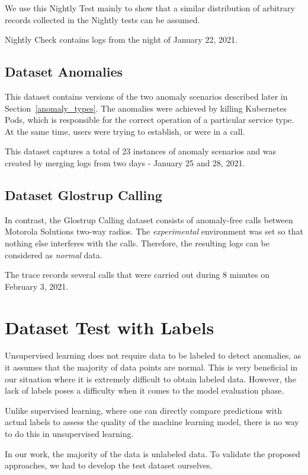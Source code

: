 We use this Nightly Test mainly to show that a similar distribution of arbitrary records collected in the Nightly tests can be assumed.

Nightly Check contains logs from the night of January 22, 2021.

\subsection{Dataset Anomalies}

This dataset contains versions of the two anomaly scenarios described later in Section~\ref{anomaly_types}. 
The anomalies were achieved by killing Kubernetes Pods, which is responsible for the correct operation of a particular service type. 
At the same time, users were trying to establish, or were in a call.

This dataset captures a total of 23 instances of anomaly scenarios and was created by merging logs from two days - January 25 and 28, 2021.

\subsection{Dataset Glostrup Calling}

In contrast, the Glostrup Calling dataset consists of anomaly-free calls between Motorola Solutions two-way radios. 
The \textit{experimental} environment was set so that nothing else interferes with the calls. Therefore, the resulting logs can be considered as \textit{normal} data.

The trace records several calls that were carried out during 8 minutes on February 3, 2021.

\section{Dataset Test with Labels} 
\label{section:testset}
Unsupervised learning does not require data to be labeled to detect anomalies, as it assumes that the majority of data points are normal.  This is very beneficial in our situation where it is extremely difficult to obtain labeled data. However, the lack of labels poses a difficulty when it comes to the model evaluation phase.

Unlike supervised learning, where one can directly compare predictions with actual labels to assess the quality of the machine learning model, there is no way to do this in unsupervised learning.

In our work, the majority of the data is unlabeled data. To validate the proposed approaches, we had to develop the test dataset ourselves.

